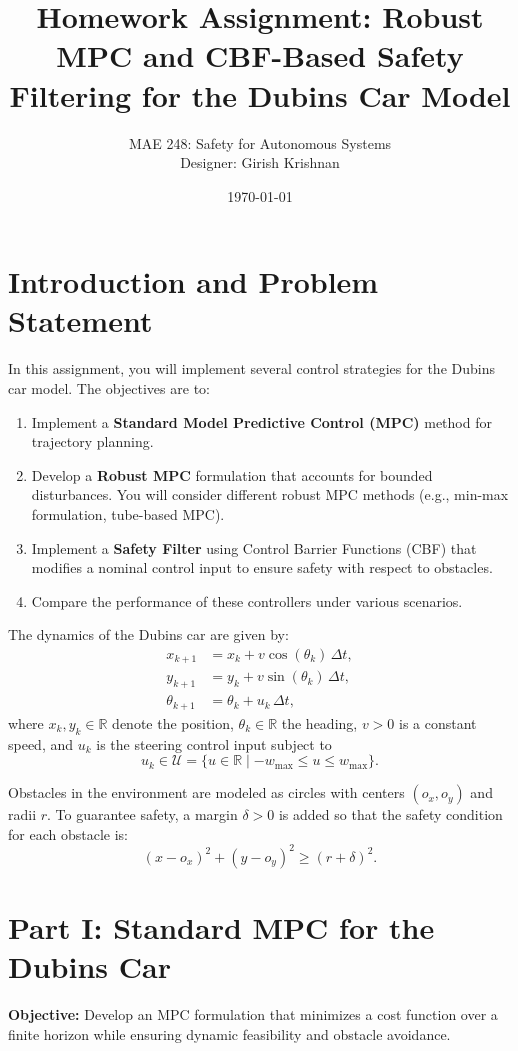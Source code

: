 \documentclass[11pt]{article}
\title{Homework Assignment: Robust MPC and CBF-Based Safety Filtering for the Dubins Car Model}
\author{MAE 248: Safety for Autonomous Systems \\ Designer: Girish Krishnan}
\date{\today}
\begin{document}
\maketitle

\section{Introduction and Problem Statement}
In this assignment, you will implement several control strategies for the Dubins car model. The objectives are to:
\begin{enumerate}[label=(\alph*)]
    \item Implement a \textbf{Standard Model Predictive Control (MPC)} method for trajectory planning.
    \item Develop a \textbf{Robust MPC} formulation that accounts for bounded disturbances. You will consider different robust MPC methods (e.g., min-max formulation, tube-based MPC).
    \item Implement a \textbf{Safety Filter} using Control Barrier Functions (CBF) that modifies a nominal control input to ensure safety with respect to obstacles.
    \item Compare the performance of these controllers under various scenarios.
\end{enumerate}

The dynamics of the Dubins car are given by:
\begin{align}
    x_{k+1} &= x_k + v \cos(\theta_k)\, \Delta t, \label{eq:dyn_x} \\
    y_{k+1} &= y_k + v \sin(\theta_k)\, \Delta t, \label{eq:dyn_y} \\
    \theta_{k+1} &= \theta_k + u_k\, \Delta t, \label{eq:dyn_theta}
\end{align}
where $x_k, y_k \in \mathbb{R}$ denote the position, $\theta_k \in \mathbb{R}$ the heading, $v>0$ is a constant speed, and $u_k$ is the steering control input subject to 
\[
u_k \in \mathcal{U} = \{ u \in \mathbb{R} \mid -w_{\max} \le u \le w_{\max} \}.
\]

Obstacles in the environment are modeled as circles with centers $(o_x, o_y)$ and radii $r$. To guarantee safety, a margin $\delta > 0$ is added so that the safety condition for each obstacle is:
\[
(x - o_x)^2 + (y - o_y)^2 \ge (r + \delta)^2.
\]

\section{Part I: Standard MPC for the Dubins Car}
\textbf{Objective:} Develop an MPC formulation that minimizes a cost function over a finite horizon while ensuring dynamic feasibility and obstacle avoidance.
\end{document}
